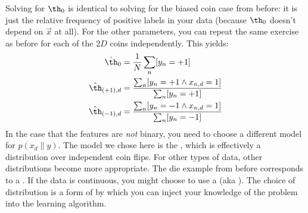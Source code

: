 %
Solving for $\th_0$ is identical to solving for the biased coin case
from before: it is just the relative frequency of positive labels in
your data (because $\th_0$ doesn't depend on $\vec x$ at all).  For
the other parameters, you can repeat the same exercise as before for
each of the $2D$ coins independently.  This yields:
%
\begin{align}
  \hat\th_0 &= \frac 1 N \sum_n [y_n = +1] \\
  \hat\th_{(+1),d} &= \frac {\sum_n [y_n = +1 \land x_{n,d} = 1]}  {\sum_n [y_n = +1]}\\
  \hat\th_{(-1),d} &= \frac {\sum_n [y_n = -1 \land x_{n,d} = 1]}  {\sum_n [y_n = -1]}
\end{align}
%
In the case that the features are \emph{not} binary, you need to
choose a different model for $p(x_d \| y)$.  The model we chose here
is the , which is effectively a
distribution over independent coin flips.  For other types of data,
other distributions become more appropriate.  The die example from
before corresponds to a .  If the data
is continuous, you might choose to use a  (aka ).  The choice of
distribution is a form of  by which you can
inject your knowledge of the problem into the learning algorithm.

